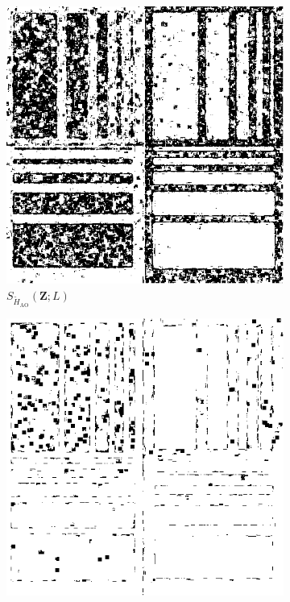 \begin{figure}[H]
  \centering
  \begin{subfigure}[b]{0.3\textwidth}
    \centering
    \includegraphics[width=\textwidth]{../../Figures/PNG/H_005_Phantom_4_z1_AO_200b}
    \caption{$S_{\widetilde{H}_{\text{AO}}}(\bm{Z}; L)$}
    \label{fig:sim_SAR_Images_p05-1}
  \end{subfigure}
  \hfill
  \begin{subfigure}[b]{0.3\textwidth}
    \centering
    \includegraphics[width=\textwidth]{../../Figures/PNG/cv_005_pvalues_Phantom_4_z1}

\end{subfigure}
\end{figure}
